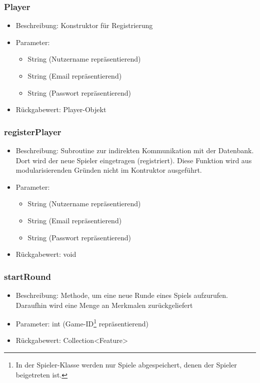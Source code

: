 \documentclass[a4paper]{scrreprt}
\begin{document}
		\subsubsection{Player}
		\begin{itemize}
			\item Beschreibung: Konstruktor für Registrierung
			\item Parameter:
				\begin{itemize}
					\item String (Nutzername repräsentierend)
					\item String (Email repräsentierend)
					\item String (Passwort repräsentierend)
				\end{itemize}
			\item Rückgabewert: Player-Objekt
		\end{itemize}
		\subsubsection{registerPlayer}
		\begin{itemize}
			\item Beschreibung: Subroutine zur indirekten Kommunikation mit der Datenbank. Dort wird der neue Spieler eingetragen (registriert). Diese Funktion wird aus modularisierenden Gründen nicht im Kontruktor ausgeführt.
			\item Parameter:
				\begin{itemize}
					\item String (Nutzername repräsentierend)
					\item String (Email repräsentierend)
					\item String (Passwort repräsentierend)
				\end{itemize}
			\item Rückgabewert: void
		\end{itemize}
		\subsubsection{startRound}
		\begin{itemize}
			\item Beschreibung: Methode, um eine neue Runde eines Spiels aufzurufen. Daraufhin wird eine Menge an Merkmalen zurückgeliefert
			\item Parameter: int (Game-ID\footnote{In der Spieler-Klasse werden nur Spiele abgespeichert, denen der Spieler beigetreten ist.} repräsentierend)
			\item Rückgabewert: Collection<Feature>
		\end{itemize}
\end{document}
